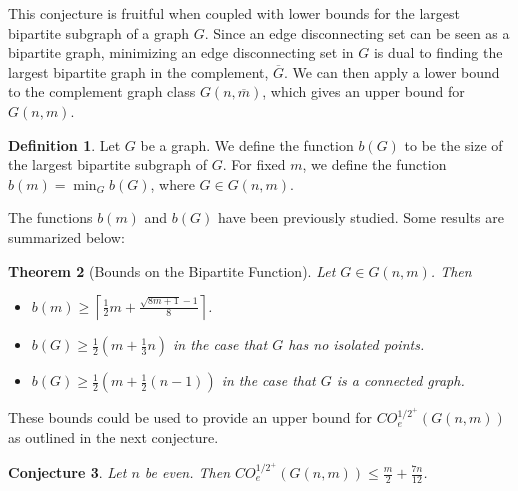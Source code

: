 \documentclass[12pt]{article}
\newtheorem{theorem}{Theorem}[section]
\newtheorem{conjecture}[theorem]{Conjecture}
\theoremstyle{definition}
\newtheorem{definition}[theorem]{Definition}
\newcommand{\COE}[2]{CO^{#1}_{e}(#2)}
\begin{document}
This conjecture is fruitful when coupled with lower bounds for the largest bipartite subgraph of a graph $G$. Since an edge disconnecting set can be seen as a bipartite graph, minimizing an edge disconnecting set in $G$ is dual to finding the largest bipartite graph in the complement, $\overline{G}$. We can then apply a lower bound to the complement graph class $G(n,\overline{m})$, which gives an upper bound for $G(n,m)$.






\begin{definition}
Let $G$ be a graph. We define the function $b(G)$ to be the size of the largest bipartite subgraph of $G$. For fixed $m$, we define the function $b(m)=\min_{G} b(G)$, where $G \in G(n,m)$.
\end{definition}

The functions $b(m)$ and $b(G)$ have been previously studied.  Some results are summarized below: 

\begin{theorem}[Bounds on the Bipartite Function]\label{bipartitefunction}
Let $G\in G(n,m)$. Then
\begin{itemize}
  \item $b(m) \geq \left\lceil{\frac{1}{2}m +\frac{\sqrt{8m+1}-1}{8}}\right\rceil$. \cite{Edwards1973}
  \item $b(G) \geq \frac{1}{2}(m + \frac{1}{3}n)$ in the case that $G$ has no isolated points. \cite{egk}
  \item $b(G) \geq \frac{1}{2}(m + \frac{1}{2}(n -1))$ in the case that $G$ is a connected graph. \cite{egk}
\end{itemize}
\end{theorem}

These bounds could be used to provide an upper bound for $\COE{1/2^+}{G(n,m)}$ as outlined in the next conjecture. 


\begin{conjecture}
Let $n$ be even. Then $\COE{1/2^+}{G(n,m)} \leq \frac{m}{2}+\frac{7n}{12}$.

\end{conjecture}
\end{document}
